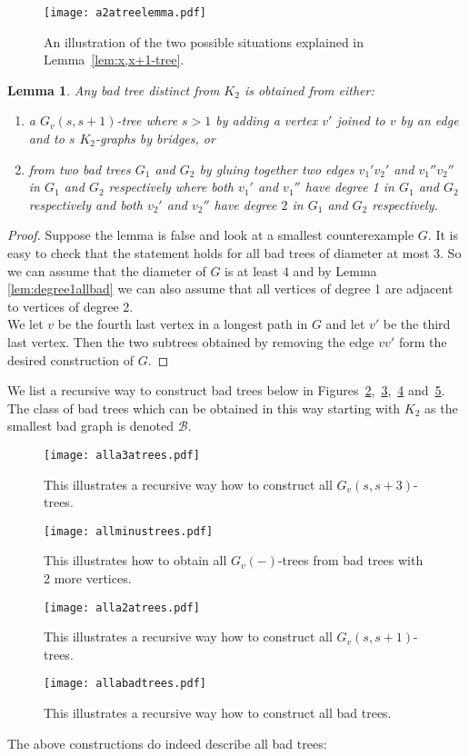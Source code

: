 \documentclass[
final,
 nomarks,
]{dmtcs-episciences}
\newtheorem{lemma}[theorem]{Lemma}
\theoremstyle{definition}
\begin{document}
\begin{figure} [H]
\centering
\texttt{[image: a2atreelemma.pdf]}
\caption{An illustration of the two possible situations explained in Lemma~\ref{lem:x,x+1-tree}.}
\label{fig:a2atreelemma}
\end{figure}
\begin{lemma} \label{lem:allbadtrees}
Any bad tree distinct from $K_2$ is obtained from either: 
\begin{enumerate}[label=(\alph*)]
\item a $G_v(s,s+1)$-tree where $s>1$ by adding a vertex $v'$ joined to $v$ by an edge and to $s$ $K_2$-graphs by bridges, or
\item from two bad trees $G_1$ and $G_2$ by gluing together two edges $v_1'v_2'$ and $v_1''v_2''$ in $G_1$ and $G_2$ respectively where both $v_1'$ and $v_1''$ have degree 1 in $G_1$ and $G_2$ respectively and both $v_2'$ and $v_2''$ have degree $2$ in $G_1$ and $G_2$ respectively. 
\end{enumerate}
\end{lemma}
\begin{proof}
Suppose the lemma is false and look at a smallest counterexample $G$. It is easy to check that the statement holds for all bad trees of diameter at most 3. So we can assume that the diameter of $G$ is at least 4 and by Lemma \ref{lem:degree1allbad} we can also assume that all vertices of degree 1 are adjacent to vertices of degree 2. \\
We let $v$ be the fourth last vertex in a longest path in $G$ and let $v'$ be the third last vertex. Then the two subtrees obtained by removing the edge $vv'$ form the desired construction of $G$. 
\end{proof}

\noindent We list a recursive way to construct bad trees below in Figures~\ref{fig:consa3atrees},~\ref{fig:consminustrees},~\ref{fig:consa2atrees} and~\ref{fig:consbadtrees}. The class of bad trees which can be obtained in this way starting with $K_2$ as the smallest bad graph is denoted $\mathcal{B}$.

\begin{figure} [H]
\centering
\texttt{[image: alla3atrees.pdf]}
\caption{This illustrates a recursive way how to construct all $G_v(s,s+3)$-trees.}
\label{fig:consa3atrees}
\end{figure}
\begin{figure} [H]
\centering
\texttt{[image: allminustrees.pdf]}
\caption{This illustrates how to obtain all $G_v(-)$-trees from bad trees with 2 more vertices.}
\label{fig:consminustrees}
\end{figure}
\begin{figure} [H]
\centering
\texttt{[image: alla2atrees.pdf]}
\caption{This illustrates a recursive way how to construct all $G_v(s,s+1)$-trees.}
\label{fig:consa2atrees}
\end{figure}
\begin{figure} [H]
\centering
\texttt{[image: allabadtrees.pdf]}
\caption{This illustrates a recursive way how to construct all bad trees.}
\label{fig:consbadtrees}
\end{figure}
\noindent The above constructions do indeed describe all bad trees:
\end{document}
